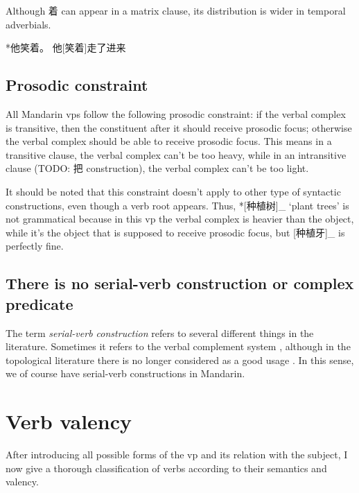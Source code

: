 \documentclass[UTF8, a4paper, oneside, scheme=plain, 12pt]{ctexrep}
\newcommand*{\citesec}[1]{\S~{#1}}
\newcommand*{\term}[1]{\emph{#1}}
\newcommand{\translate}[1]{`#1'}
\begin{document}
Although 着 can appear in a matrix clause, 
its distribution is wider in temporal adverbials. 

*他笑着。
他[笑着]走了进来

\section{Prosodic constraint}\label{sec:vp.prosody}

All Mandarin \acs{vp}s follow the following prosodic constraint:
if the verbal complex is transitive,
then the constituent after it should receive prosodic focus; 
otherwise the verbal complex should be able to receive prosodic focus. 
This means in a transitive clause, 
the verbal complex can't be too heavy, 
while in an intransitive clause (TODO: 把 construction), 
the verbal complex can't be too light. 

It should be noted that this constraint doesn't apply 
to other type of syntactic constructions, 
even though a verb root appears. 
Thus, *[种植树]_{} \translate{plant trees} 
is not grammatical
because in this \acs{vp} the verbal complex is heavier than the object, 
while it's the object that is supposed to receive prosodic focus, 
but [种植牙]_{} is perfectly fine. 


\section{There is no serial-verb construction or complex predicate}\label{sec:no-serial-verb}

The term \term{serial-verb construction} refers to several different things in the literature.
Sometimes it refers to the verbal complement system
\citep{chen2016mandarin}, 
although in the topological literature 
there is no longer considered as a good usage 
\citep[\citesec{10.1}; note that %
the V2s in Yakkha complex predication highly resembles Mandarin directional verbal complements 
in their formal aspects]{schackow2015grammar}. 
In this sense, we of course have serial-verb constructions in Mandarin.

\chapter{Verb valency}

After introducing all possible forms of the \acs{vp}
and its relation with the subject,
I now give a thorough classification of verbs 
according to their semantics and valency.
\end{document}
